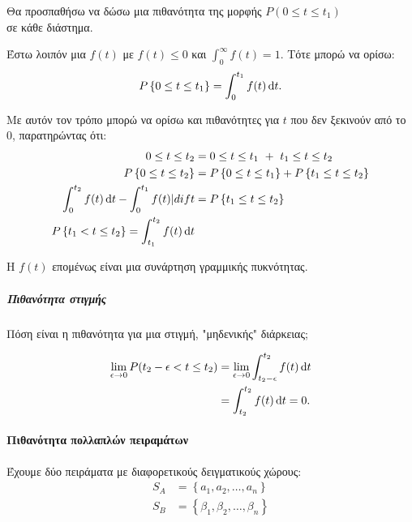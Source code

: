 \documentclass[11pt,a4paper,notitlepage,fleqn,draft]{article}
\begin{document}
	Θα προσπαθήσω να δώσω μια πιθανότητα της μορφής 
	\( P(0 \leq t \leq t_1) \)
	\\σε κάθε διάστημα.
	
	Έστω λοιπόν μια \underline{\( f(t) \)} με \( f(t) \leq 0 \) και
	\( \displaystyle \int_0^\infty f(t) = 1 \). Τότε μπορώ να ορίσω:
	\[
	P\left\lbrace 0 \leq t \leq t_1 \right\rbrace =
	\int_0^{t_1} f(t)\mathop{}\!\mathrm{d} t.
	\]
	
	Με αυτόν τον τρόπο μπορώ να ορίσω και πιθανότητες για \( t \) που
	δεν ξεκινούν από το 0, παρατηρώντας ότι:
	\begin{align*}
	0 \leq t \leq t_2 &= 0 \leq t \leq t_1 \ + \ t_1\leq t \leq t_2 \\
	P\left\lbrace 0\leq t \leq t_2 \right\rbrace &=
	P\left\lbrace 0 \leq t \leq t_1 \right\rbrace + P\left\lbrace 
	t_1 \leq t \leq t_2 \right\rbrace \\
	\int_0^{t_2} f(t)\mathop{}\!\mathrm{d} t - \int_0^{t_1} f(t)|dif t &=
	P\left\lbrace t_1 \leq t \leq t_2 \right\rbrace \\
	P\left\lbrace t_1<t\leq t_2 \right\rbrace =
	\int_{t_1}^{t_2} f(t)\mathop{}\!\mathrm{d} t
	\end{align*}


	Η \( f(t) \) επομένως είναι μια συνάρτηση γραμμικής πυκνότητας.
	
	\subparagraph{Πιθανότητα στιγμής}
	Πόση είναι η πιθανότητα για μια στιγμή, "μηδενικής" διάρκειας;
	
	\begin{align*}
		\lim_{\epsilon\to 0} P(t_2-\epsilon < t \leq t_2) &=
		\lim_{\epsilon\to 0} \int_{t_2-\epsilon}^{t_2} f(t)\mathop{}\!\mathrm{d} t
		\\ &= \int_{t_2}^{t_2} f(t)\mathop{}\!\mathrm{d} t = 0.
	\end{align*}
	
	\paragraph{Πιθανότητα πολλαπλών πειραμάτων}
	Έχουμε δύο πειράματα με διαφορετικούς δειγματικούς χώρους:
	\begin{align*}
		S_A &= \left\lbrace a_1,a_2,\dots,a_n \right\rbrace \\
		S_B &= \left\lbrace \beta_1,\beta_2,\dots,\beta_n \right\rbrace
	\end{align*}
	
\end{document}
